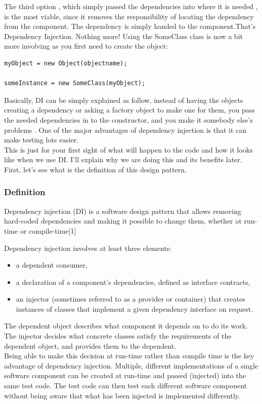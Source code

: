 \documentclass[14pt,a4paper]{extreport}
\begin{document}
The third option , which simply passed the dependencies into where it is needed , is the most viable, since it removes the responsibility of locating the dependency from the component. The dependency is simply handed to the component.That's Dependency Injection. Nothing more! Using the SomeClass class is now a bit more 
involving as you first need to create the object:
\begin{verbatim}
myObject = new Object(objectname);

someInstance = new SomeClass(myObject);
\end{verbatim}
Basically, DI can be simply explained as follow, instead of having the objects creating a dependency or asking a factory object to make one for them, you pass the needed dependencies in to the constructor, and you make it somebody else's problems . One of the major advantages of dependency injection is that it can make testing lots easier. 
\\

This is just for your first sight of what will happen to the code and how it looks like when we use DI. I’ll explain why we are doing this and its benefits later. First, let’s see what is the definition of this design pattern.

			\subsubsection{Definition}
			Dependency injection (DI) is a software design pattern that allows removing hard-coded dependencies and making it possible to change them, whether at run-time or compile-time[1]

Dependency injection involves at least three elements:
\begin{itemize}
\item a dependent consumer,
\item a declaration of a component's dependencies, defined as interface contracts,
\item an injector (sometimes referred to as a provider or container) that creates instances of classes that implement a given dependency interface on request.
\end{itemize}

The dependent object describes what component it depends on to do its work. The injector decides what concrete classes satisfy the requirements of the dependent object, and provides them to the dependent.
\\

Being able to make this decision at run-time rather than compile time is the key advantage of dependency injection. Multiple, different implementations of a single software component can be created at run-time and passed (injected) into the same test code. The test code can then test each different software component without 
being aware that what has been injected is implemented differently.
\end{document}
